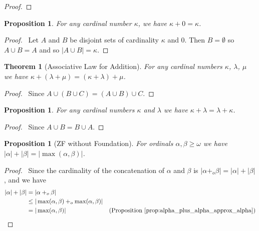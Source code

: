 \documentclass{book}
\let\qed\relax
\newtheorem{prop}[ax]{Proposition}
\newtheorem{thm}[ax]{Theorem}
\theoremstyle{definition}
\begin{document}
\begin{proof}
\pf
{}
\qed
\end{proof}

\begin{prop}
For any cardinal number $\kappa$, we have $\kappa + 0 = \kappa$.
\end{prop}

\begin{proof}
\pf\ Let $A$ and $B$ be disjoint sets of cardinality $\kappa$ and 0. Then $B = \emptyset$ so $A \cup B = A$ and so $|A \cup B| = \kappa$. \qed
\end{proof}

\begin{thm}[Associative Law for Addition]
For any cardinal numbers $\kappa$, $\lambda$, $\mu$ we have $\kappa + (\lambda + \mu) = (\kappa + \lambda) + \mu$.
\end{thm}

\begin{proof}
\pf\ Since $A \cup (B \cup C) = (A \cup B) \cup C$. \qed
\end{proof}

\begin{prop}
For any cardinal numbers $\kappa$ and $\lambda$ we have $\kappa + \lambda = \lambda + \kappa$.
\end{prop}

\begin{proof}
\pf\ Since $A \cup B = B \cup A$. \qed
\end{proof}

\begin{prop}[ZF without Foundation]
For ordinals $\alpha, \beta \geq \omega$ we have $|\alpha| + |\beta| = |\max(\alpha, \beta)|$.
\end{prop}

\begin{proof}
\pf\ Since the cardinality of the concatenation of $\alpha$ and $\beta$ is $|\alpha +_o \beta| = |\alpha| + |\beta|$, and we have
\begin{align*}
|\alpha| + |\beta| & = |\alpha +_o \beta| \\
& \leq |\max(\alpha, \beta) +_o \max(\alpha, \beta)| \\
& = |\max(\alpha,\beta)| & (\text{Proposition \ref{prop:alpha_plus_alpha_approx_alpha}}) \qed
\end{align*}
\end{proof}
\end{document}
